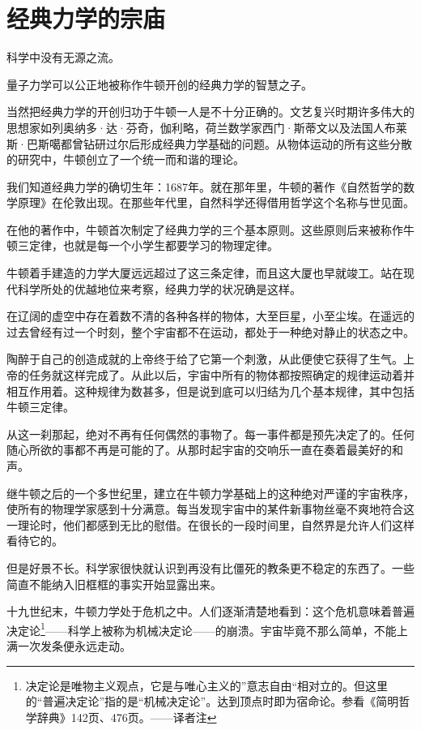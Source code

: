 \section{经典力学的宗庙}

科学中没有无源之流。

量子力学可以公正地被称作牛顿开创的经典力学的智慧之子。

当然把经典力学的开创归功于牛顿一人是不十分正确的。文艺复兴时期许多伟大的思想家如列奥纳多·达·芬奇，伽利略，荷兰数学家西门·斯蒂文以及法国人布莱斯·巴斯噶都曾钻研过尔后形成经典力学基础的问题。从物体运动的所有这些分散的研究中，牛顿创立了一个统一而和谐的理论。

我们知道经典力学的确切生年：1687年。就在那年里，牛顿的著作《自然哲学的数学原理》在伦敦出现。在那些年代里，自然科学还得借用哲学这个名称与世见面。

在他的著作中，牛顿首次制定了经典力学的三个基本原则。这些原则后来被称作牛顿三定律，也就是每一个小学生都要学习的物理定律。

牛顿着手建造的力学大厦远远超过了这三条定律，而且这大厦也早就竣工。站在现代科学所处的优越地位来考察，经典力学的状况确是这样。

在辽阔的虚空中存在着数不清的各种各样的物体，大至巨星，小至尘埃。在遥远的过去曾经有过一个时刻，整个宇宙都不在运动，都处于一种绝对静止的状态之中。

陶醉于自己的创造成就的上帝终于给了它第一个刺激，从此便使它获得了生气。上帝的任务就这样完成了。从此以后，宇宙中所有的物体都按照确定的规律运动着并相互作用着。这种规律为数甚多，但是说到底可以归结为几个基本规律，其中包括牛顿三定律。

从这一刹那起，绝对不再有任何偶然的事物了。每一事件都是预先决定了的。任何随心所欲的事都不再是可能的了。从那时起宇宙的交响乐一直在奏着最美好的和声。

继牛顿之后的一个多世纪里，建立在牛顿力学基础上的这种绝对严谨的宇宙秩序，使所有的物理学家感到十分满意。每当发现宇宙中的某件新事物丝毫不爽地符合这一理论时，他们都感到无比的慰借。在很长的一段时间里，自然界是允许人们这样看待它的。

但是好景不长。科学家很快就认识到再没有比僵死的教条更不稳定的东西了。一些简直不能纳入旧框框的事实开始显露出来。

十九世纪末，牛顿力学处于危机之中。人们逐渐清楚地看到：这个危机意味着普遍决定论\footnote{决定论是唯物主义观点，它是与唯心主义的”意志自由“相对立的。但这里的“普遍决定论”指的是“机械决定论”。达到顶点时即为宿命论。参看《简明哲学辞典》142页、476页。——译者注}——科学上被称为机械决定论——的崩溃。宇宙毕竟不那么简单，不能上满一次发条便永远走动。

